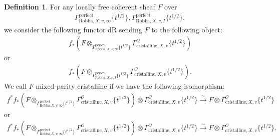 \documentclass[12pt]{book}
\theoremstyle{definition}
\newtheorem{definition}{Definition}
\begin{document}
\begin{definition}
For any locally free coherent sheaf $F$ over
\begin{align}
\Gamma^\mathrm{perfect}_{\text{Robba},X,v,\infty}\{t^{1/2}\},\Gamma^\mathrm{perfect}_{\text{Robba},X,v,I}\{t^{1/2}\},
\end{align} 
we consider the following functor $\mathrm{dR}$ sending $F$ to the following object:
\begin{align}
f_*(F\otimes_{\Gamma^\mathrm{perfect}_{\text{Robba},X,v,\infty}\{t^{1/2}\}} \Gamma^\mathcal{O}_{\text{cristalline},X,v}\{t^{1/2}\})
\end{align}
or 
\begin{align}
f_*(F\otimes_{\Gamma^\mathrm{perfect}_{\text{Robba},X,v,I}\{t^{1/2}\}} \Gamma^\mathcal{O}_{\text{cristalline},X,v}\{t^{1/2}\}).
\end{align}
We call $F$ mixed-parity cristalline if we have the following isomorphism:
\begin{align}
f^*f_*(F\otimes_{\Gamma^\mathrm{perfect}_{\text{Robba},X,v,\infty}\{t^{1/2}\}} \Gamma^\mathcal{O}_{\text{cristalline},X,v}\{t^{1/2}\}) \otimes \Gamma^\mathcal{O}_{\text{cristalline},X,v}\{t^{1/2}\} \overset{\sim}{\longrightarrow} F \otimes \Gamma^\mathcal{O}_{\text{cristalline},X,v}\{t^{1/2}\} 
\end{align}
or 
\begin{align}
f^*f_*(F\otimes_{\Gamma^\mathrm{perfect}_{\text{Robba},X,v,\infty}\{t^{1/2}\}} \Gamma^\mathcal{O}_{\text{cristalline},X,v}\{t^{1/2}\}) \otimes \Gamma^\mathcal{O}_{\text{cristalline},X,v}\{t^{1/2}\} \overset{\sim}{\longrightarrow} F \otimes \Gamma^\mathcal{O}_{\text{cristalline},X,v}\{t^{1/2}\}. 
\end{align}
\end{definition}
\end{document}
